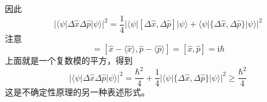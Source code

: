 \documentclass[12pt]{article}
\begin{document}
    因此
    \begin{equation*}
        |\langle \psi |\Delta \hat{x} \Delta \hat{p}|\psi \rangle|^2 = \frac 14 |\langle \psi |[\Delta \hat{x},\Delta \hat{p}]|\psi \rangle + \langle \psi |\{\Delta \hat{x},\Delta \hat{p}\}|\psi \rangle|^2
    \end{equation*}
    注意
    \begin{equation*}
        [\Delta \hat{x},\Delta \hat{p}] = [\hat{x}-\langle \hat{x} \rangle, \hat{p}-\langle \hat{p} \rangle ] = [\hat{x},\hat{p}] = \mathrm{i}\hbar
    \end{equation*}
    上面就是一个复数模的平方，得到
    \begin{equation*}
        |\langle \psi |\Delta \hat{x} \Delta \hat{p}|\psi \rangle|^2 = \frac {\hbar^2}4 + \frac 14 |\langle \psi |\{\Delta \hat{x},\Delta \hat{p}\}|\psi \rangle|^2 \geqslant \frac {\hbar^2}4
    \end{equation*}
    这是不确定性原理的另一种表述形式。
\end{document}
